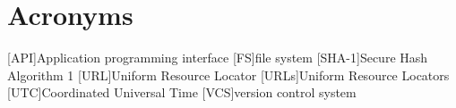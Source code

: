 \chapter*{Acronyms}
\begin{acronym}
    [API]{Application programming interface}
    [FS]{file system}
    [SHA-1]{Secure Hash Algorithm 1}
    [URL]{Uniform Resource Locator}
    [URLs]{Uniform Resource Locators}
    [UTC]{Coordinated Universal Time}
    [VCS]{version control system}
\end{acronym}
